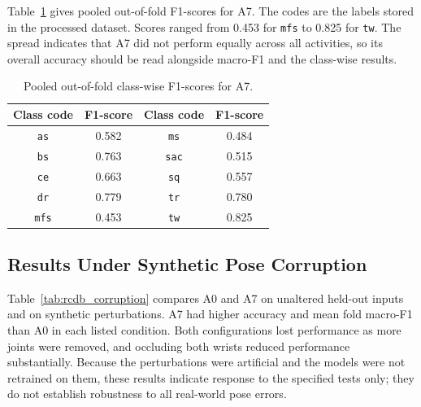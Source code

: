 Table~\ref{tab:rcdb_class_f1} gives pooled out-of-fold F1-scores for A7. The codes are the labels stored in the processed dataset. Scores ranged from 0.453 for \texttt{mfs} to 0.825 for \texttt{tw}. The spread indicates that A7 did not perform equally across all activities, so its overall accuracy should be read alongside macro-F1 and the class-wise results.

\begin{table}[htbp]
\centering
\caption{Pooled out-of-fold class-wise F1-scores for A7.}
\label{tab:rcdb_class_f1}
\begin{tabular}{|c|c||c|c|}
\hline
\textbf{Class code} & \textbf{F1-score} & \textbf{Class code} & \textbf{F1-score} \\
\hline
\texttt{as} & 0.582 & \texttt{ms} & 0.484 \\
\hline
\texttt{bs} & 0.763 & \texttt{sac} & 0.515 \\
\hline
\texttt{ce} & 0.663 & \texttt{sq} & 0.557 \\
\hline
\texttt{dr} & 0.779 & \texttt{tr} & 0.780 \\
\hline
\texttt{mfs} & 0.453 & \texttt{tw} & 0.825 \\
\hline
\end{tabular}
\end{table}

\subsection{Results Under Synthetic Pose Corruption}

Table~\ref{tab:rcdb_corruption} compares A0 and A7 on unaltered held-out inputs and on synthetic perturbations. A7 had higher accuracy and mean fold macro-F1 than A0 in each listed condition. Both configurations lost performance as more joints were removed, and occluding both wrists reduced performance substantially. Because the perturbations were artificial and the models were not retrained on them, these results indicate response to the specified tests only; they do not establish robustness to all real-world pose errors.

